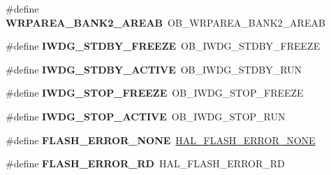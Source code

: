 \begin{DoxyCompactItemize}
\item 
\mbox{\label{group___h_a_l___f_l_a_s_h___aliased___defines_gad9e82d85eb324cdc5d4c5071a5b41dc6}} 
\#define {\bfseries W\+R\+P\+A\+R\+E\+A\+\_\+\+B\+A\+N\+K2\+\_\+\+A\+R\+E\+AB}~O\+B\+\_\+\+W\+R\+P\+A\+R\+E\+A\+\_\+\+B\+A\+N\+K2\+\_\+\+A\+R\+E\+AB
\item 
\mbox{\label{group___h_a_l___f_l_a_s_h___aliased___defines_ga29ecb28c7e5de9b73778a4de74cdba4e}} 
\#define {\bfseries I\+W\+D\+G\+\_\+\+S\+T\+D\+B\+Y\+\_\+\+F\+R\+E\+E\+ZE}~O\+B\+\_\+\+I\+W\+D\+G\+\_\+\+S\+T\+D\+B\+Y\+\_\+\+F\+R\+E\+E\+ZE
\item 
\mbox{\label{group___h_a_l___f_l_a_s_h___aliased___defines_ga24bb71bfed2d31ab1c89e2c14617a738}} 
\#define {\bfseries I\+W\+D\+G\+\_\+\+S\+T\+D\+B\+Y\+\_\+\+A\+C\+T\+I\+VE}~O\+B\+\_\+\+I\+W\+D\+G\+\_\+\+S\+T\+D\+B\+Y\+\_\+\+R\+UN
\item 
\mbox{\label{group___h_a_l___f_l_a_s_h___aliased___defines_gafa9a4aaff8763eed2aaeae674dffd159}} 
\#define {\bfseries I\+W\+D\+G\+\_\+\+S\+T\+O\+P\+\_\+\+F\+R\+E\+E\+ZE}~O\+B\+\_\+\+I\+W\+D\+G\+\_\+\+S\+T\+O\+P\+\_\+\+F\+R\+E\+E\+ZE
\item 
\mbox{\label{group___h_a_l___f_l_a_s_h___aliased___defines_gab00290e46777b5c22558554403dee8c4}} 
\#define {\bfseries I\+W\+D\+G\+\_\+\+S\+T\+O\+P\+\_\+\+A\+C\+T\+I\+VE}~O\+B\+\_\+\+I\+W\+D\+G\+\_\+\+S\+T\+O\+P\+\_\+\+R\+UN
\item 
\mbox{\label{group___h_a_l___f_l_a_s_h___aliased___defines_ga12c2b55f5c37a54b5733d005ce82a0de}} 
\#define {\bfseries F\+L\+A\+S\+H\+\_\+\+E\+R\+R\+O\+R\+\_\+\+N\+O\+NE}~\hyperlink{group___f_l_a_s_h___error___codes_gae7fb9ee7198d393aba27ade3a9f50a70}{H\+A\+L\+\_\+\+F\+L\+A\+S\+H\+\_\+\+E\+R\+R\+O\+R\+\_\+\+N\+O\+NE}
\item 
\mbox{\label{group___h_a_l___f_l_a_s_h___aliased___defines_gac032c0eace095140c41d6b63b9292dc2}} 
\#define {\bfseries F\+L\+A\+S\+H\+\_\+\+E\+R\+R\+O\+R\+\_\+\+RD}~H\+A\+L\+\_\+\+F\+L\+A\+S\+H\+\_\+\+E\+R\+R\+O\+R\+\_\+\+RD

\end{DoxyCompactItemize}

